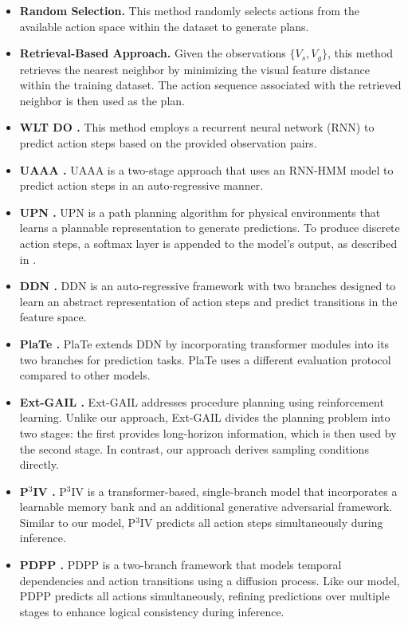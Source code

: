 \begin{itemize}
    \item \textbf{Random Selection.} This method randomly selects actions from the available action space within the dataset to generate plans.
    \item \textbf{Retrieval-Based Approach.} Given the observations \(\{V_s, V_g\}\), this method retrieves the nearest neighbor by minimizing the visual feature distance within the training dataset. The action sequence associated with the retrieved neighbor is then used as the plan.
    \item \textbf{WLT DO \citep{ehsani2018let}.} This method employs a recurrent neural network (RNN) to predict action steps based on the provided observation pairs.
    \item \textbf{UAAA \citep{abu2019uncertainty}.} UAAA is a two-stage approach that uses an RNN-HMM model to predict action steps in an auto-regressive manner.
    \item \textbf{UPN \citep{srinivas2018universal}.} UPN is a path planning algorithm for physical environments that learns a plannable representation to generate predictions. To produce discrete action steps, a softmax layer is appended to the model's output, as described in \citep{chang2020procedure}.
    \item \textbf{DDN \citep{chang2020procedure}.} DDN is an auto-regressive framework with two branches designed to learn an abstract representation of action steps and predict transitions in the feature space.
    \item \textbf{PlaTe \citep{sun2022plate}.} PlaTe extends DDN by incorporating transformer modules into its two branches for prediction tasks. PlaTe uses a different evaluation protocol compared to other models.
    \item \textbf{Ext-GAIL \citep{bi2021procedure}.} Ext-GAIL addresses procedure planning using reinforcement learning. Unlike our approach, Ext-GAIL divides the planning problem into two stages: the first provides long-horizon information, which is then used by the second stage. In contrast, our approach derives sampling conditions directly.
    \item \textbf{P$^3$IV \citep{zhao2022p3iv}.} P$^3$IV is a transformer-based, single-branch model that incorporates a learnable memory bank and an additional generative adversarial framework. Similar to our model, P$^3$IV predicts all action steps simultaneously during inference.
    \item \textbf{PDPP \citep{wang2023pdpp}.} PDPP is a two-branch framework that models temporal dependencies and action transitions using a diffusion process. Like our model, PDPP predicts all actions simultaneously, refining predictions over multiple stages to enhance logical consistency during inference.

\end{itemize}

